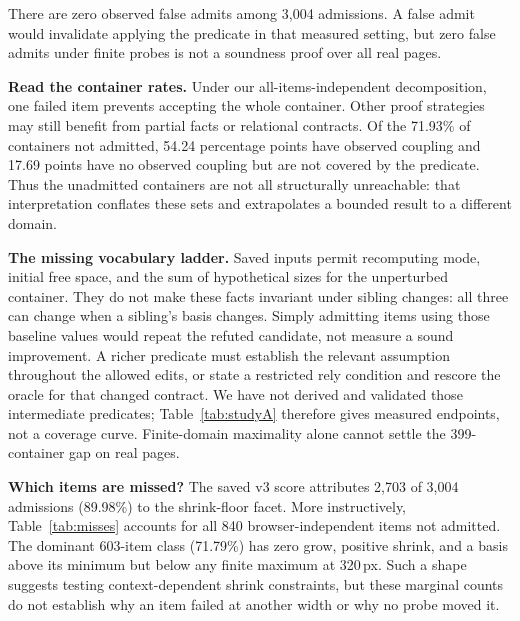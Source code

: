 \documentclass[acmsmall,screen,review,anonymous,nonacm]{acmart}
\begin{document}
There are zero observed false admits among 3{,}004 admissions. A false admit would invalidate applying the predicate in that measured setting, but zero false admits under finite probes is not a soundness proof over all real pages.

\textbf{Read the container rates.} Under our all-items-independent decomposition, one failed item prevents accepting the whole container. Other proof strategies may still benefit from partial facts or relational contracts. Of the 71.93\% of containers not admitted, 54.24 percentage points have observed coupling and 17.69 points have no observed coupling but are not covered by the predicate. Thus the unadmitted containers are not all structurally unreachable: that interpretation conflates these sets and extrapolates a bounded result to a different domain.

\textbf{The missing vocabulary ladder.} Saved inputs permit recomputing mode, initial free space, and the sum of hypothetical sizes for the unperturbed container. They do not make these facts invariant under sibling changes: all three can change when a sibling's basis changes. Simply admitting items using those baseline values would repeat the refuted candidate, not measure a sound improvement. A richer predicate must establish the relevant assumption throughout the allowed edits, or state a restricted rely condition and rescore the oracle for that changed contract. We have not derived and validated those intermediate predicates; Table~\ref{tab:studyA} therefore gives measured endpoints, not a coverage curve. Finite-domain maximality alone cannot settle the 399-container gap on real pages.

\textbf{Which items are missed?} The saved v3 score attributes 2{,}703 of 3{,}004 admissions (89.98\%) to the shrink-floor facet. More instructively, Table~\ref{tab:misses} accounts for all 840 browser-independent items not admitted. The dominant 603-item class (71.79\%) has zero grow, positive shrink, and a basis above its minimum but below any finite maximum at 320\,px. Such a shape suggests testing context-dependent shrink constraints, but these marginal counts do not establish why an item failed at another width or why no probe moved it.
\end{document}

